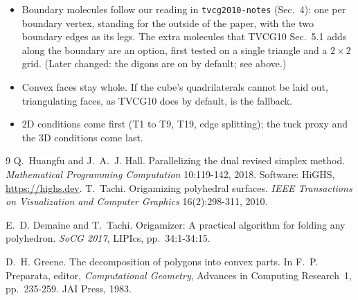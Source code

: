 \documentclass[11pt]{article}
\theoremstyle{definition}
\begin{document}
\begin{itemize}[nosep]
  \item Boundary molecules follow our reading in \texttt{tvcg2010-notes}
    (Sec.~4): one per boundary vertex, standing for the outside of the paper,
    with the two boundary edges as its legs. The extra molecules that TVCG10
    Sec.~5.1 adds along the boundary are an option, first tested on a single
    triangle and a $2\times2$ grid. (Later changed: the digons are on by
    default; see above.)
  \item Convex faces stay whole. If the cube's quadrilaterals cannot be laid
    out, triangulating faces, as TVCG10 does by default, is the fallback.
  \item 2D conditions come first (T1 to T9, T19, edge splitting); the tuck
    proxy and the 3D conditions come last.
\end{itemize}

\begin{thebibliography}{9}
Q.~Huangfu and J.~A.~J. Hall. Parallelizing the dual revised simplex method.
\emph{Mathematical Programming Computation} 10:119-142, 2018. Software:
HiGHS, \url{https://highs.dev}.
T.~Tachi. Origamizing polyhedral surfaces. \emph{IEEE Transactions on
Visualization and Computer Graphics} 16(2):298-311, 2010.

E.~D. Demaine and T.~Tachi. Origamizer: A practical algorithm for folding any
polyhedron. \emph{SoCG 2017}, LIPIcs, pp.~34:1-34:15.

D.~H. Greene. The decomposition of polygons into convex parts. In
F.~P. Preparata, editor, \emph{Computational Geometry}, Advances in Computing
Research~1, pp.~235-259. JAI Press, 1983.
\end{thebibliography}
\end{document}
